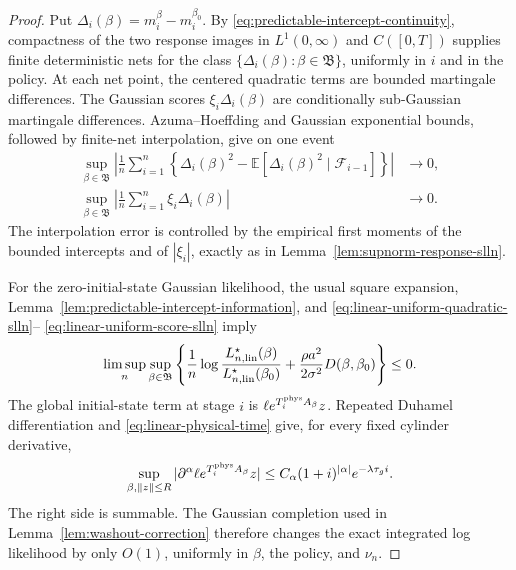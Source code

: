 \begin{proof}
Put
\(\Delta_i(\beta)=m_i^\beta-m_i^{\beta_0}\).  By
\eqref{eq:predictable-intercept-continuity}, compactness of the two response
images in \(L^1(0,\infty)\) and \(C([0,T])\) supplies finite deterministic
nets for the class \(\{\Delta_i(\beta):\beta\in\mathfrak B\}\), uniformly in
\(i\) and in the policy.  At each net point, the centered quadratic terms
are bounded martingale differences.  The Gaussian scores
\(\xi_i\Delta_i(\beta)\) are conditionally sub-Gaussian martingale
differences.  Azuma--Hoeffding and Gaussian exponential bounds, followed by
finite-net interpolation, give on one event
\begin{align}
 \sup_{\beta\in\mathfrak B}\left|
 \frac1n\sum_{i=1}^n\left\{
 \Delta_i(\beta)^2-
 \mathbb E[\Delta_i(\beta)^2\mid\mathcal F_{i-1}]
 \right\}\right|&\longrightarrow0,
 \label{eq:linear-uniform-quadratic-slln}\\
 \sup_{\beta\in\mathfrak B}\left|
 \frac1n\sum_{i=1}^n\xi_i\Delta_i(\beta)
 \right|&\longrightarrow0.
 \label{eq:linear-uniform-score-slln}
\end{align}
The interpolation error is controlled by the empirical first moments of the
bounded intercepts and of \(|\xi_i|\), exactly as in
Lemma~\ref{lem:supnorm-response-slln}.

For the zero-initial-state Gaussian likelihood, the usual square expansion,
Lemma~\ref{lem:predictable-intercept-information}, and
\eqref{eq:linear-uniform-quadratic-slln}--
\eqref{eq:linear-uniform-score-slln} imply
\begin{equation}
 \limsup_n\sup_{\beta\in\mathfrak B}
 \left\{\frac1n\log
 \frac{L_{n,{\rm lin}}^\star(\beta)}
      {L_{n,{\rm lin}}^\star(\beta_0)}
 +\frac{\rho a^2}{2\sigma^2}D(\beta,\beta_0)\right\}\le0.
 \label{eq:linear-uniform-likelihood-upper}
\end{equation}
The global initial-state term at stage \(i\) is
\(\ell e^{T_i^{\rm phys}A_\beta}z\).  Repeated Duhamel differentiation and
\eqref{eq:linear-physical-time} give, for every fixed cylinder derivative,
\[
 \sup_{\beta,\|z\|\le R}
 |\partial^\alpha\ell e^{T_i^{\rm phys}A_\beta}z|
 \le C_\alpha(1+i)^{|\alpha|}e^{-\lambda\tau_gi}.
\]
The right side is summable.  The Gaussian completion used in
Lemma~\ref{lem:washout-correction} therefore changes the exact integrated
log likelihood by only \(O(1)\), uniformly in \(\beta\), the policy, and
\(\nu_n\).


\end{proof}
